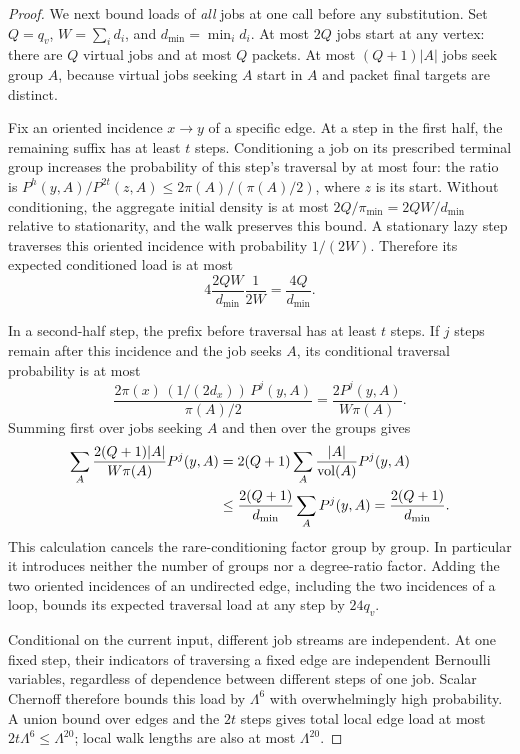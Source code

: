 \begin{proof}
We next bound loads of \emph{all} jobs at one call before any
substitution.  Set $Q=q_v$, $W=\sum_i d_i$, and
$d_{\min}=\min_i d_i$.  At most $2Q$ jobs start at any vertex:
there are $Q$ virtual jobs and at most $Q$ packets.  At most
$(Q+1)|A|$ jobs seek group $A$, because virtual jobs seeking $A$
start in $A$ and packet final targets are distinct.

Fix an oriented incidence $x\to y$ of a specific edge.  At a step
in the first half, the remaining suffix has at least $t$ steps.
Conditioning a job on its prescribed terminal group increases the
probability of this step's traversal by at most four: the ratio is
$P^h(y,A)/P^{2t}(z,A)\le2\pi(A)/(\pi(A)/2)$, where $z$ is its
start.  Without conditioning, the aggregate initial density is at
most $2Q/\pi_{\min}=2QW/d_{\min}$ relative to stationarity, and
the walk preserves this bound.  A stationary lazy step traverses
this oriented incidence with probability $1/(2W)$.  Therefore its
expected conditioned load is at most
\begin{equation}\label{route:first-half-load}
 4\frac{2QW}{d_{\min}}\frac{1}{2W}
       =\frac{4Q}{d_{\min}}.
\end{equation}

In a second-half step, the prefix before traversal has at least
$t$ steps.  If $j$ steps remain after this incidence and the job
seeks $A$, its conditional traversal probability is at most
\[
 \frac{2\pi(x)\,(1/(2d_x))\,P^j(y,A)}{\pi(A)/2}
       =\frac{2P^j(y,A)}{W\pi(A)}.
\]
Summing first over jobs seeking $A$ and then over the groups gives
\begin{align}
 \sum_A\frac{2(Q+1)|A|}{W\pi(A)}P^j(y,A)
 &=2(Q+1)\sum_A\frac{|A|}{\operatorname{vol}(A)}P^j(y,A)\notag\\
 &\le\frac{2(Q+1)}{d_{\min}}\sum_AP^j(y,A)
 =\frac{2(Q+1)}{d_{\min}}.\label{route:second-half-load}
\end{align}
This calculation cancels the rare-conditioning factor group by
group.  In particular it introduces neither the number of groups
nor a degree-ratio factor.  Adding the two oriented incidences of
an undirected edge, including the two incidences of a loop, bounds
its expected traversal load at any step by $24q_v$.

Conditional on the current input, different job streams are
independent.  At one fixed step, their indicators of traversing
a fixed edge are independent Bernoulli variables, regardless of
dependence between different steps of one job.  Scalar Chernoff
therefore bounds this load by $\Lambda^6$ with overwhelmingly high
probability.  A union bound over edges and the $2t$ steps gives
total local edge load at most $2t\Lambda^6\le\Lambda^{20}$;
local walk lengths are also at most $\Lambda^{20}$.


\end{proof}
